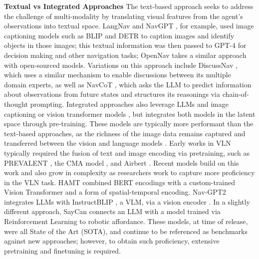 \documentclass{svproc}
\begin{document}
    \textbf{Textual vs Integrated Approaches} The text-based approach seeks to address the challenge of multi-modality by translating visual features from the agent's observations into textual space. LangNav \cite{pan2024langnavlanguageperceptualrepresentation} and NavGPT \cite{zhou2023navgptexplicitreasoningvisionandlanguage}, for example, used image captioning models such as BLIP \cite{li2022blipbootstrappinglanguageimagepretraining, li2023blip2bootstrappinglanguageimagepretraining} and DETR \cite{zhu2021deformabledetrdeformabletransformers} to caption images and identify objects in those images; this textual information was then passed to GPT-4 for decision making and other navigation tasks; OpenNav \cite{open-nav} takes a similar approach with open-sourced models. Variations on this approach include DiscussNav \cite{long2023_discussnav}, which uses a similar mechanism to enable discussions between its multiple domain experts, as well as NavCoT \cite{lin2024navcotboostingllmbasedvisionandlanguage}, which asks the LLM to predict information about observations from future states and structures its reasonings via chain-of-thought prompting. Integrated approaches also leverage LLMs and image captioning or vision transformer models \cite{dosovitskiy2021imageworth16x16words}, but integrates both models in the latent space through pre-training. These models are typically more performant than the text-based approaches, as the richness of the image data remains captured and transferred between the vision and language models \cite{pan2024langnavlanguageperceptualrepresentation}. Early works in VLN typically required the fusion of text and image encoding via pretraining, such as PREVALENT \cite{9156554}, the CMA model \cite{krantz2020navgraphvisionandlanguagenavigationcontinuous}, and Airbert \cite{Guhur_2021_ICCV}. Recent models build on this work and also grow in complexity as researchers work to capture more proficiency in the VLN task. HAMT \cite{chen2021_HAMT} combined BERT \cite{devlin-etal-2019-bert} encodings with a custom-trained Vision Transformer \cite{dosovitskiy2021imageworth16x16words} and a form of spatial-temporal encoding.  Nav-GPT2 \cite{navgpt2} integrates LLMs with InstructBLIP \cite{dai2023instructblipgeneralpurposevisionlanguagemodels}, a VLM, via a vision encoder \cite{10203681}. In a slightly different approach, SayCan \cite{51647} connects an LLM with a model trained via Reinforcement Learning to robotic affordance. These models, at time of release, were all State of the Art (SOTA), and continue to be referenced as benchmarks against new approaches; however, to obtain such proficiency, extensive pretraining and finetuning is required.
\end{document}
